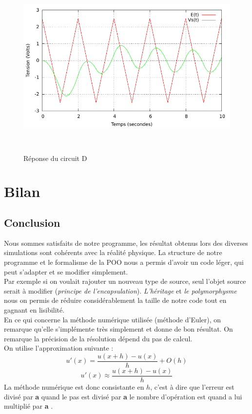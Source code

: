 \documentclass[a4paper,11pt]{article}
\begin{document}
\begin{figure}[h!]
\begin{minipage}[b]{0.5\linewidth}
   \end{minipage}
  \begin{minipage}[b]{0.5\linewidth}   
      \centering \includegraphics[scale=.68]{CDtriangle.pdf}
   \end{minipage}\\
 \caption{Réponse du circuit D}
\end{figure}

\newpage
 \section{Bilan}
\subsection{Conclusion}
Nous sommes satisfaits de notre programme, les résultat obtenus lors des diverses simulations sont cohérents avec la réalité physique.
La structure de notre programme et le formalisme de la POO nous a permis d'avoir un code léger, qui peut s'adapter et se modifier simplement.\\
Par exemple si on voulait rajouter un nouveau type de source, seul l'objet source serait à modifier (\emph{principe de l'encapsulation}).
 \emph{L'héritage} et \emph{le polymorphysme}
nous on permis de réduire considérablement la taille de notre code tout en gagnant en lisibilité.\\

En ce qui concerne la méthode numérique utilisée (méthode d'Euler), on remarque qu'elle s'implémente très simplement et donne de bon résultat. On remarque 
la précision de la résolution dépend du pas de calcul.\\
On utilise l'approximation suivante  :
\begin{equation*}
u'(x)=\frac{u(x+h)-u(x)}{h}+O(h)
\end{equation*}
\begin{equation*}
u'(x)\approx\frac{u(x+h)-u(x)}{h}
\end{equation*}
La méthode numérique est donc consistante en $h$, c'est à dire que l'erreur est divisé par \textbf{a} quand le pas est divisé par \textbf{a} 
le nombre d'opération est quand a lui multiplié par \textbf{a} .
\end{document}
